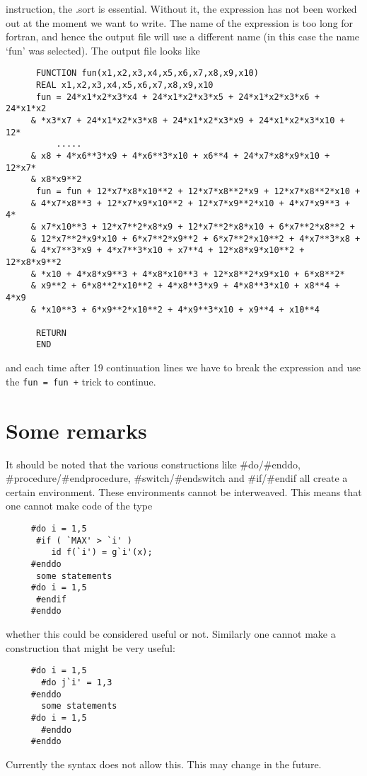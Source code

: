instruction, the .sort is essential. Without it, the 
expression has not been worked out at the moment we want to write. The name 
of the expression is too long for fortran, and hence the 
output file will use a different name (in this case the name `fun' was 
selected). The output file looks like
\begin{verbatim}
      FUNCTION fun(x1,x2,x3,x4,x5,x6,x7,x8,x9,x10)
      REAL x1,x2,x3,x4,x5,x6,x7,x8,x9,x10
      fun = 24*x1*x2*x3*x4 + 24*x1*x2*x3*x5 + 24*x1*x2*x3*x6 + 24*x1*x2
     & *x3*x7 + 24*x1*x2*x3*x8 + 24*x1*x2*x3*x9 + 24*x1*x2*x3*x10 + 12*
          .....
     & x8 + 4*x6**3*x9 + 4*x6**3*x10 + x6**4 + 24*x7*x8*x9*x10 + 12*x7*
     & x8*x9**2
      fun = fun + 12*x7*x8*x10**2 + 12*x7*x8**2*x9 + 12*x7*x8**2*x10 + 
     & 4*x7*x8**3 + 12*x7*x9*x10**2 + 12*x7*x9**2*x10 + 4*x7*x9**3 + 4*
     & x7*x10**3 + 12*x7**2*x8*x9 + 12*x7**2*x8*x10 + 6*x7**2*x8**2 + 
     & 12*x7**2*x9*x10 + 6*x7**2*x9**2 + 6*x7**2*x10**2 + 4*x7**3*x8 + 
     & 4*x7**3*x9 + 4*x7**3*x10 + x7**4 + 12*x8*x9*x10**2 + 12*x8*x9**2
     & *x10 + 4*x8*x9**3 + 4*x8*x10**3 + 12*x8**2*x9*x10 + 6*x8**2*
     & x9**2 + 6*x8**2*x10**2 + 4*x8**3*x9 + 4*x8**3*x10 + x8**4 + 4*x9
     & *x10**3 + 6*x9**2*x10**2 + 4*x9**3*x10 + x9**4 + x10**4

      RETURN
      END
\end{verbatim}
and each time after 19 continuation lines we have to break the expression 
and use the \verb:fun = fun +: trick to continue.


\section{Some remarks}
It should be noted that the various constructions like 
\#do/\#enddo, 
\#procedure/\#endprocedure, 
\#switch/\#endswitch and 
\#if/\#endif all 
create a certain environment. These environments cannot be interweaved. This 
means that one cannot make code of the type
\begin{verbatim}
     #do i = 1,5
      #if ( `MAX' > `i' )
         id f(`i') = g`i'(x);
     #enddo
      some statements
     #do i = 1,5
      #endif
     #enddo
\end{verbatim}
whether this could be considered useful or not. Similarly one cannot make a 
construction that might be very useful:
\begin{verbatim}
     #do i = 1,5
       #do j`i' = 1,3
     #enddo
       some statements
     #do i = 1,5
       #enddo
     #enddo
\end{verbatim}
Currently the syntax does not allow this. This may change in the future.



